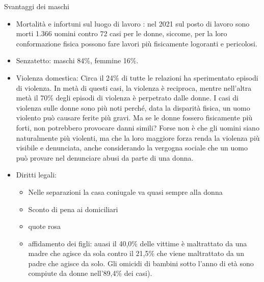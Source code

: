 \documentclass[12pt]{book} %
\begin{document}
Svantaggi dei maschi
\begin{itemize}
\item Mortalità e infortuni sul luogo di lavoro : nel 2021 sul posto di
lavoro sono morti 1.366 uomini contro 72 casi per le donne, siccome, per la loro conformazione fisica possono fare lavori più fisicamente logoranti e pericolosi. 
\item Senzatetto: maschi 84\%, femmine 16\%.
\item Violenza domestica: Circa il 24\% di tutte le relazioni ha sperimentato episodi di violenza. In metà di questi casi, la violenza è reciproca, mentre nell'altra metà il 70\% degli episodi di violenza è perpetrato dalle donne. I casi di violenza sulle donne sono più noti perché, data la disparità fisica, un uomo violento può causare ferite più gravi. Ma se le donne fossero fisicamente più forti, non potrebbero provocare danni simili? Forse non è che gli uomini siano naturalmente più violenti, ma che la loro maggiore forza renda la violenza più visibile e denunciata, anche considerando la vergogna sociale che un uomo può provare nel denunciare abusi da parte di una donna. 
\item Diritti legali: 
    \begin{itemize}
    \item Nelle separazioni la casa coniugale va quasi sempre alla donna 
    \item Sconto di pena ai domiciliari
    \item quote rosa
    \item affidamento dei figli: auasi il 40,0\% delle vittime è maltrattato da una madre che agisce da sola contro il 21,5\% che viene maltrattato da un padre che agisce da solo. Gli omicidi di bambini sotto l'anno di età sono compiute da donne nell'89,4\% dei casi).

\end{itemize}
\end{itemize}
\end{document}
